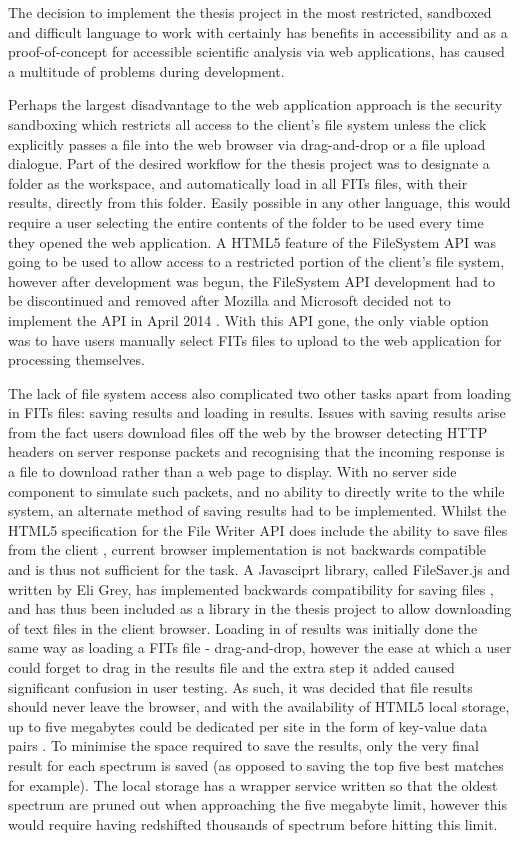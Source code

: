 \documentclass[titlesmallcaps, examinerscopy, copyrightpage]{uqthesis}
\begin{document}
The decision to implement the thesis project in the most restricted, sandboxed and difficult language to work with certainly has benefits in accessibility and as a proof-of-concept for accessible scientific analysis via web applications, has caused a multitude of problems during development.

Perhaps the largest disadvantage to the web application approach is the security sandboxing which restricts all access to the client's file system unless the click explicitly passes a file into the web browser via drag-and-drop or a file upload dialogue. Part of the desired workflow for the thesis project was to designate a folder as the workspace, and automatically load in all FITs files, with their results, directly from this folder. Easily possible in any other language, this would require a user selecting the entire contents of the folder to be used every time they opened the web application. A HTML5 feature of the FileSystem API was going to be used to allow access to a restricted portion of the client's file system, however after development was begun, the FileSystem API development had to be discontinued and removed after Mozilla and Microsoft decided not to implement the API in April 2014 \cite{filesystem}. With this API gone, the only viable option was to have users manually select FITs files to upload to the web application for processing themselves.

The lack of file system access also complicated two other tasks apart from loading in FITs files: saving results and loading in results. Issues with saving results arise from the fact users download files off the web by the browser detecting HTTP headers on server response packets and recognising that the incoming response is a file to download rather than a web page to display. With no server side component to simulate such packets, and no ability to directly write to the while system, an alternate method of saving results had to be implemented. Whilst the HTML5 specification for the File Writer API does include the ability to save files from the client \cite{save1}, current browser implementation is not backwards compatible and is thus not sufficient for the task. A Javasciprt library, called FileSaver.js and written by Eli Grey, has implemented backwards compatibility for saving files \cite{save2}, and has thus been included as a library in the thesis project to allow downloading of text files in the client browser. Loading in of results was initially done the same way as loading a FITs file - drag-and-drop, however the ease at which a user could forget to drag in the results file and the extra step it added caused significant confusion in user testing. As such, it was decided that file results should never leave the browser, and with the availability of HTML5 local storage, up to five megabytes could be dedicated per site in the form of key-value data pairs \cite{local}. To minimise the space required to save the results, only the very final result for each spectrum is saved (as opposed to saving the top five best matches for example). The local storage has a wrapper service written so that the oldest spectrum are pruned out when approaching the five megabyte limit, however this would require having redshifted thousands of spectrum before hitting this limit.
\end{document}
